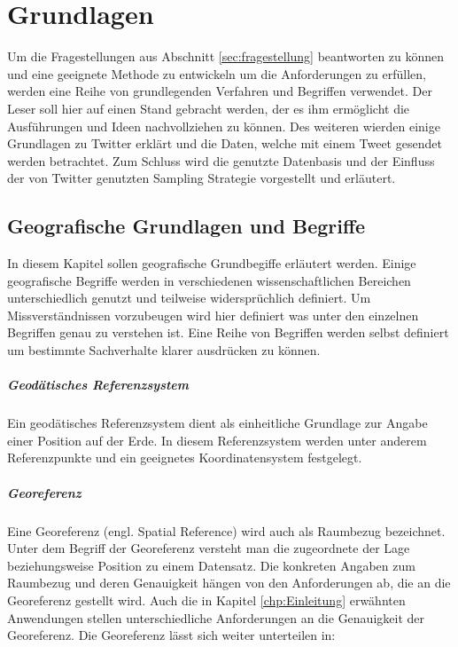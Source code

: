 \chapter{Grundlagen} 
Um die Fragestellungen aus Abschnitt \ref{sec:fragestellung} beantworten zu können und eine geeignete Methode zu entwickeln um die Anforderungen zu erfüllen, werden eine Reihe von grundlegenden Verfahren und Begriffen verwendet. 
Der Leser soll hier auf einen Stand gebracht werden, der es ihm ermöglicht die Ausführungen und Ideen nachvollziehen zu können.  
Des weiteren wierden einige Grundlagen zu Twitter erklärt und die Daten, welche mit einem Tweet gesendet werden betrachtet.
Zum Schluss wird die genutzte Datenbasis und der Einfluss der von Twitter genutzten Sampling Strategie vorgestellt und erläutert.

\newpage

	\section{Geografische Grundlagen und Begriffe}
	In diesem Kapitel sollen geografische Grundbegiffe erläutert werden. 
	Einige geografische Begriffe werden in verschiedenen wissenschaftlichen Bereichen unterschiedlich genutzt und teilweise widersprüchlich definiert. 
	Um Missverständnissen vorzubeugen wird hier definiert was unter den einzelnen Begriffen genau zu verstehen ist.
	Eine Reihe von Begriffen werden selbst definiert um bestimmte Sachverhalte klarer ausdrücken zu können. 

		\paragraph*{Geodätisches Referenzsystem} 
		Ein geodätisches Referenzsystem dient als einheitliche Grundlage zur Angabe einer Position auf der Erde. 
		In diesem Referenzsystem werden unter anderem Referenzpunkte und ein geeignetes Koordinatensystem festgelegt.  
		
		\paragraph{Georeferenz}
		Eine Georeferenz (engl. Spatial Reference) wird auch als Raumbezug bezeichnet. 
		Unter dem Begriff der Georeferenz versteht man die zugeordnete der Lage beziehungsweise Position zu einem Datensatz. 
		Die konkreten Angaben zum Raumbezug und deren Genauigkeit hängen von den Anforderungen ab, die an die Georeferenz gestellt wird. 
		Auch die in Kapitel \ref{chp:Einleitung} erwähnten Anwendungen stellen unterschiedliche Anforderungen an die Genauigkeit der Georeferenz.
		Die Georeferenz lässt sich weiter unterteilen in:
		
